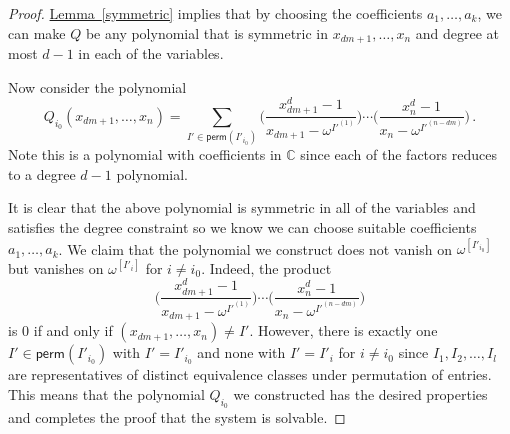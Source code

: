 \documentclass[11pt]{article}
\numberwithin{equation}{section}
\theoremstyle{definition}
\theoremstyle{plain}
\newcommand{\C}{\mathbb C}
\newcommand{\expref}[2]{\hyperref[#2]{#1~\ref{#2}}}
\theoremstyle{definition}
\renewcommand\C{{\mathbb{C}}}
\newcommand\perm{\textsf{perm}}
\begin{document}
\begin{proof}
\expref{Lemma}{symmetric} implies that by choosing the coefficients $a_1, \dots , a_k$, we can make $Q$ be any polynomial that is symmetric in $x_{dm+1} ,\dots ,x_n$ and degree at most $d-1$ in each of the variables.  


Now consider the polynomial 
\[
Q_{i_0}(x_{dm+1}, \dots , x_n) = \sum_{I' \in \perm(I'_{i_0})} \bigg( \frac{x_{dm+1}^d-1}{x_{dm+1}-\omega^{I'^{(1)}}} \bigg) \cdots \bigg( \frac{x_n^d-1}{x_n-\omega^{I'^{(n-dm)}}} \bigg) \,.
\]
Note this is a polynomial with coefficients in $\C$ since each of the factors reduces to a degree $d-1$ polynomial.

It is clear that the above polynomial is symmetric in all of the variables and satisfies the degree constraint so we know we can choose suitable coefficients $a_1, \dots  , a_k$.  We claim that the polynomial we construct does not vanish on $\omega^{[I'_{i_0}]}$ but vanishes on $\omega^{[I'_{i}]}$ for $i \neq i_0$.  Indeed, the product
\[
\bigg( \frac{x_{dm+1}^d-1}{x_{dm+1}-\omega^{I'^{(1)}}} \bigg) \cdots \bigg( \frac{x_n^d-1}{x_n-\omega^{I'^{(n-dm)}}} \bigg)
\]
is $0$ if and only if $(x_{dm+1}, \dots , x_{n}) \neq I'$.  However, there is exactly one $I' \in \perm(I'_{i_0})$ with $I' = I'_{i_0}$ and none with $I' = I'_{i}$ for $i \neq i_0$ since $I_1, I_2, \dots , I_l$ are representatives of distinct equivalence classes under permutation of entries.  This means that the polynomial $Q_{i_0}$ we constructed has the desired properties and completes the proof that the system is solvable.
\end{proof}
\end{document}

